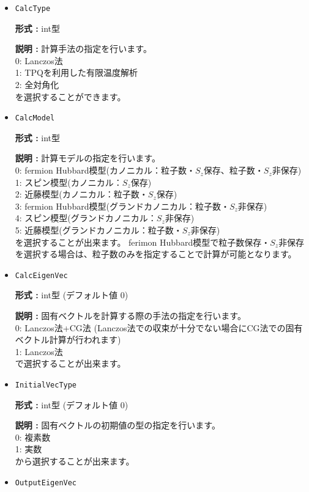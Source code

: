 \begin{itemize}
\item  \verb|CalcType|

{\bf 形式 :} int型 

{\bf 説明 :} 計算手法の指定を行います。\\
0: Lanczos法\\
1: TPQを利用した有限温度解析\\
2: 全対角化\\
を選択することができます。

\item  \verb|CalcModel|

{\bf 形式 :} int型 

{\bf 説明 :} 計算モデルの指定を行います。\\
0: fermion Hubbard模型(カノニカル：粒子数・$S_z$保存、{粒子数・$S_z$非保存})\\
1: スピン模型(カノニカル：$S_z$保存)\\
2: 近藤模型(カノニカル：粒子数・$S_z$保存)\\
3: fermion Hubbard模型(グランドカノニカル：粒子数・$S_z$非保存)\\
4: スピン模型(グランドカノニカル：$S_z$非保存)\\
5: 近藤模型(グランドカノニカル：粒子数・$S_z$非保存)\\
を選択することが出来ます。
{ferimon Hubbard模型で粒子数保存・$S_z$非保存を選択する場合は、粒子数のみを指定することで計算が可能となります。}

\item  \verb|CalcEigenVec|

{\bf 形式 :} int型 (デフォルト値 0)

{\bf 説明 :} 固有ベクトルを計算する際の手法の指定を行います。\\
0: Lanczos法+CG法 (Lanczos法での収束が十分でない場合にCG法での固有ベクトル計算が行われます)\\
1: Lanczos法\\
で選択することが出来ます。

\item  \verb|InitialVecType|

{\bf 形式 :} int型 (デフォルト値 0)

{\bf 説明 :} 固有ベクトルの初期値の型の指定を行います。\\
0: 複素数\\
1: 実数\\
から選択することが出来ます。

\item  \verb|OutputEigenVec|


\end{itemize}
